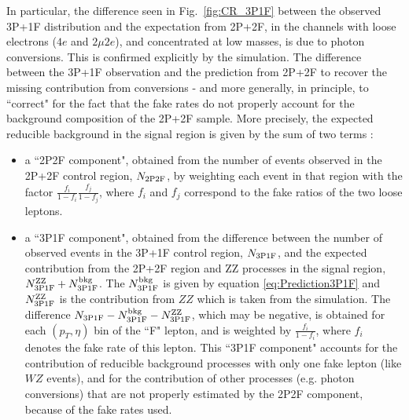 In particular, the  difference seen in Fig.~\ref{fig:CR_3P1F} between the observed
3P+1F distribution and the expectation from 2P+2F, in the
channels with loose electrons ($4e$ and $2\mu 2e$), and concentrated at low
masses, is due to photon conversions. This is confirmed explicitly by the
simulation.
%
The difference between the 3P+1F observation and the prediction
from 2P+2F to recover the missing contribution from conversions - and more generally,
in principle, to ``correct" for the fact that the fake rates do not properly
account for the background composition of the 2P+2F sample.
More precisely, the expected reducible background in the signal region is given
by the sum of two terms :
%
\begin{itemize}
\item a ``2P2F component", obtained from the number of
  events observed in the 2P+2F control region, $N_{\rm 2P2F}$, by
  weighting each event in that region with the factor
  $\frac{f_{i}}{1-f_{i}} \frac{f_{j}}{1-f_{j}}$, where $f_{i}$ and
  $f_{j}$ correspond to the fake ratios of the two loose leptons.
\item a ``3P1F component", obtained from the
   difference between the number of observed events in the 3P+1F control
   region, $N_{\rm 3P1F}$, and the expected contribution from the 2P+2F
   region and ZZ processes in the signal region, $N^{\rm ZZ}_{\rm 3P1F} +
   N^{\rm bkg}_{\rm 3P1F}$. The $N^{\rm bkg}_{\rm 3P1F}$ is given by 
   equation \ref{eq:Prediction3P1F} and $N^{\rm ZZ}_{\rm 3P1F}$ is the
   contribution from $ZZ$ which is taken from the simulation. 
   The difference $N_{\rm 3P1F} -  N^{\rm bkg}_{\rm 3P1F} - N^{\rm ZZ}_{\rm 3P1F}$,
   which may be negative,
   is obtained for each $(p_T, \eta)$ bin of the ``F" lepton, and is weighted 
   by $\frac{f_i} {1 - f_i}$, where $f_i$ denotes the fake rate of
   this lepton.
   This ``3P1F component" accounts for the contribution of reducible background
   processes with only one fake lepton (like $WZ$ events), and for the contribution
   of other processes (e.g. photon conversions) that are not properly estimated
   by the 2P2F component, because of the fake rates used.
\end{itemize}

